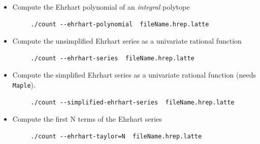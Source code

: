 \documentclass{article}
\newcommand{\maple}{{\tt Maple}\xspace}
\begin{document}
\begin{itemize}
\item Compute the Ehrhart polynomial of an \emph{integral} polytope
	\begin{verbatim}
     ./count --ehrhart-polynomial  fileName.hrep.latte
	\end{verbatim} 
\item Compute the unsimplified Ehrhart series as a univariate rational function
	\begin{verbatim}
     ./count --ehrhart-series  fileName.hrep.latte
	\end{verbatim} 
\item Compute the simplified Ehrhart series as a univariate rational function (needs \maple).
	\begin{verbatim}
     ./count --simplified-ehrhart-series  fileName.hrep.latte
	\end{verbatim} 
\item Compute the first N terms of the Ehrhart series
	\begin{verbatim}
     ./count --ehrhart-taylor=N  fileName.hrep.latte
	\end{verbatim} 
\end{itemize}
\end{document}
